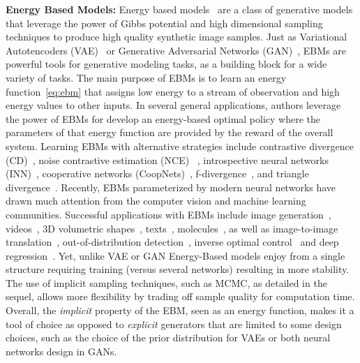 \documentclass{article} %
\begin{document}
\vspace{0.1in}\noindent\textbf{Energy Based Models: }
Energy based models~\cite{lecun2006tutorial,ngiam2011learning} are a class of generative models that leverage the power of Gibbs potential and high dimensional sampling techniques to produce high quality synthetic image samples.
Just as Variational Autotencoders (VAE)~\cite{kingma2013auto} or Generative Adversarial Networks (GAN)~\cite{goodfellow2014generative}, EBMs are powerful tools for generative modeling tasks, as a building block for a wide variety of tasks. 
The main purpose of EBMs is to learn an energy function~\eqref{eq:ebm} that assigns low energy to a stream of observation and high energy values to other inputs.
In several general applications, authors leverage the power of EBMs for  develop an energy-based optimal policy where the parameters of that energy function are provided by the reward of the overall system.
Learning EBMs with alternative strategies include contrastive divergence (CD)~\cite{hinton2002training,tieleman2008training}, noise contrastive estimation (NCE)~\cite{gutmann2010noise,gao2020flow} , introspective neural networks (INN)~\cite{lazarow2017introspective,jin2017introspective,lee2018wasserstein}, cooperative networks (CoopNets)~\cite{xie2020learning,xie2021cooperative}, f-divergence~\cite{yu2020training}, and triangle divergence~\cite{han2019divergence,han2020joint}.
Recently, EBMs parameterized by modern neural networks have drawn much attention from the computer vision and machine learning communities. 
Successful applications with EBMs include image generation~\cite{xie2016theory,gao2018learning,du2019implicit}, videos~\cite{XieCVPR17,xie2019learning}, 3D volumetric shapes~\cite{xie2018learning,xie2020generative}, 
texts~\cite{deng2020residual}, molecules~\cite{ingraham2018learning,du2019energy}, as well as image-to-image translation~\cite{xie2021cooperative,xie2021cycleCoopNets}, %
out-of-distribution detection~\cite{ebmood2020}, inverse optimal control~\cite{xu2019energy} and deep regression~\cite{gustafsson2020energy}.
Yet, unlike VAE or GAN Energy-Based models enjoy from a single structure requiring training (versus several networks) resulting in more stability.
The use of implicit sampling techniques, such as MCMC, as detailed in the sequel, allows more flexibility by trading off sample quality for computation time.
Overall, the \emph{implicit} property of the EBM, seen as an energy function, makes it a tool of choice as opposed to \emph{explicit} generators that are limited to some design choices, such as the choice of the prior distribution for VAEs or both neural networks design in GANs.
\end{document}
